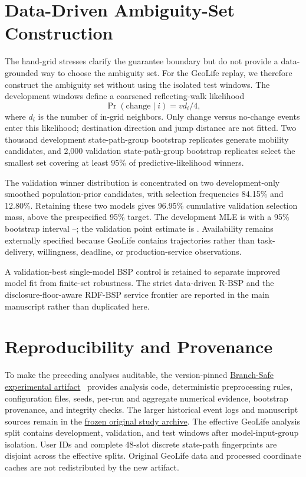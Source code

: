 \documentclass[10pt,journal,compsoc]{IEEEtran}
\begin{document}
\section{Data-Driven Ambiguity-Set Construction}
The hand-grid stresses clarify the guarantee boundary but do not provide a data-grounded way to choose the ambiguity set. For the GeoLife replay, we therefore construct the ambiguity set without using the \GeoTestN{} isolated test windows. The \GeoDevN{} development windows define a coarsened reflecting-walk likelihood
\[
\Pr(\mathrm{change}\mid i)=v d_i/4,
\]
where \(d_i\) is the number of in-grid neighbors. Only change versus no-change events enter this likelihood; destination direction and jump distance are not fitted. Two thousand development state-path-group bootstrap replicates generate mobility candidates, and 2,000 validation state-path-group bootstrap replicates select the smallest set covering at least 95\% of predictive-likelihood winners.

The validation winner distribution is concentrated on two development-only smoothed population-prior candidates, with selection frequencies 84.15\% and 12.80\%. Retaining these two models gives 96.95\% cumulative validation selection mass, above the prespecified 95\% target. The development MLE is \GeoDevMLE{} with a 95\% bootstrap interval \GeoDevCILow--\GeoDevCIHigh{}; the validation point estimate is \GeoValMLE{}. Availability remains externally specified because GeoLife contains trajectories rather than task-delivery, willingness, deadline, or production-service observations.

A validation-best single-model BSP control is retained to separate improved model fit from finite-set robustness. The strict data-driven R-BSP and the disclosure-floor-aware RDF-BSP service frontier are reported in the main manuscript rather than duplicated here.

\section{Reproducibility and Provenance}
To make the preceding analyses auditable, the version-pinned \href{https://github.com/js110/Branch-Safe/tree/2dfaeeced5bb162203fa689b482d229371a17671}{Branch-Safe experimental artifact}~\cite{bspartifact2026} provides analysis code, deterministic preprocessing rules, configuration files, seeds, per-run and aggregate numerical evidence, bootstrap provenance, and integrity checks. The larger historical event logs and manuscript sources remain in the \href{https://github.com/js110/Bpaper/tree/2cc94ff6e7c4696dc364392dc19c8137d0cb7e65}{frozen original study archive}. The effective GeoLife analysis split contains \GeoDevN{} development, \GeoValN{} validation, and \GeoTestN{} test windows after model-input-group isolation. User IDs and complete 48-slot discrete state-path fingerprints are disjoint across the effective splits. Original GeoLife data and processed coordinate caches are not redistributed by the new artifact.
\end{document}
